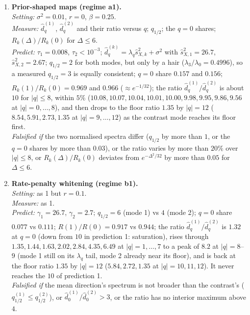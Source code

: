 \documentclass[11pt,a4paper]{article}
\theoremstyle{remark}
\begin{document}
\begin{enumerate}[leftmargin=2em,itemsep=4pt]
  \item \textbf{Prior-shaped maps (regime a1).}\\
  \emph{Setting:} $\sigma^2 = 0.01$, $r = 0$, $\beta = 0.25$.\\
  \emph{Measure:} $\hat d_q^{(1)}$, $\hat d_q^{(2)}$ and their ratio versus $q$; $q_{1/2}$; the $q = 0$ shares; $R_k(\Delta)/R_k(0)$ for $\Delta\le6$.\\
  \emph{Predict:} $\tau_1 = 0.008$, $\tau_2<10^{-3}$; $\hat d_q^{(k)} = \lambda_q\hat s_{X,k}^2 + \sigma^2$ with $\hat s_{X,1}^2 = 26.7$, $\hat s_{X,2}^2 = 2.67$; $q_{1/2} = 2$ for both modes, but only by a hair ($\lambda_3/\lambda_0 = 0.4996$), so a measured $q_{1/2} = 3$ is equally consistent; $q = 0$ share $0.157$ and $0.156$; $R_k(1)/R_k(0) = 0.969$ and $0.966$ ($\approx e^{-1/32}$); the ratio $\hat d_q^{(1)}/\hat d_q^{(2)}$ is about $10$ for $|q|\le8$, within $5\%$ ($10.08, 10.07, 10.04, 10.01, 10.00, 9.98, 9.95, 9.86, 9.56$ at $|q| = 0,\dots,8$), and then drops to the floor ratio $1.35$ by $|q| = 12$ ($8.54, 5.91, 2.73, 1.35$ at $|q| = 9,\dots,12$) as the contrast mode reaches its floor first.\\
  \emph{Falsified if} the two normalised spectra differ ($q_{1/2}$ by more than $1$, or the $q = 0$ shares by more than $0.03$), or the ratio varies by more than $20\%$ over $|q|\le8$, or $R_k(\Delta)/R_k(0)$ deviates from $e^{-\Delta^2/32}$ by more than $0.05$ for $\Delta\le6$.

  \item \textbf{Rate-penalty whitening (regime b1).}\\
  \emph{Setting:} as 1 but $r = 0.1$.\\
  \emph{Measure:} as 1.\\
  \emph{Predict:} $\gamma_1 = 26.7$, $\gamma_2 = 2.7$; $q_{1/2} = 6$ (mode 1) vs $4$ (mode 2); $q = 0$ share $0.077$ vs $0.111$; $R(1)/R(0) = 0.917$ vs $0.944$; the ratio $\hat d_q^{(1)}/\hat d_q^{(2)}$ is $1.32$ at $q = 0$ (down from $10$ in prediction 1: saturation), rises through $1.35, 1.44, 1.63, 2.02, 2.84, 4.35, 6.49$ at $|q| = 1,\dots,7$ to a peak of $8.2$ at $|q| = 8$--$9$ (mode 1 still on its $\lambda_q$ tail, mode 2 already near its floor), and is back at the floor ratio $1.35$ by $|q| = 12$ ($5.84, 2.72, 1.35$ at $|q| = 10, 11, 12$). It never reaches the $10$ of prediction 1.\\
  \emph{Falsified if} the mean direction's spectrum is not broader than the contrast's ($q^{(1)}_{1/2}\le q^{(2)}_{1/2}$), or $\hat d_0^{(1)}/\hat d_0^{(2)}>3$, or the ratio has no interior maximum above $4$.


\end{enumerate}
\end{document}
